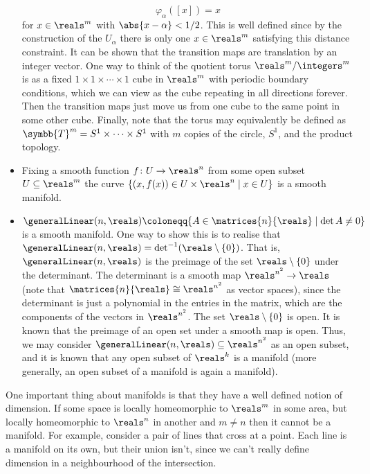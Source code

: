 \documentclass[fleqn]{NotesClass}
\newcommand{\torus}{\symbb{T}}
\newcommand{\isomorphic}{\cong}
\begin{document}
\begin{exm}{}{}
\begin{itemize}
            \begin{equation}
                \varphi_\alpha([x]) = x
            \end{equation}
            for \(x \in \reals^m\) with \(\abs{x - \alpha} < 1/2\).
            This is well defined since by the construction of the \(U_\alpha\) there is only one \(x \in \reals^m\) satisfying this distance constraint.
            It can be shown that the transition maps are translation by an integer vector.
            One way to think of the quotient torus \(\reals^m/\integers^m\) is as a fixed \(1 \times 1 \times \dotsb \times 1\) cube in \(\reals^m\) with periodic boundary conditions, which we can view as the cube repeating in all directions forever.
            Then the transition maps just move us from one cube to the same point in some other cube.
            Finally, note that the torus may equivalently be defined as \(\torus^m = S^1 \times \dotsb \times S^1\) with \(m\) copies of the circle, \(S^1\), and the product topology.
            \item Fixing a smooth function \(f \colon U \to \reals^n\) from some open subset \(U \subseteq \reals^m\) the curve \(\{(x, f(x)) \in U \times \reals^n \mid x \in U\}\) is a smooth manifold.
            \item \(\generalLinear(n, \reals) \coloneqq \{A \in \matrices{n}{\reals} \mid \det A \ne 0\}\) is a smooth manifold.
            One way to show this is to realise that \(\generalLinear(n, \reals) = \det^{-1}(\reals \setminus \{0\})\).
            That is, \(\generalLinear(n, \reals)\) is the preimage of the set \(\reals \setminus \{0\}\) under the determinant.
            The determinant is a smooth map \(\reals^{n^2} \to \reals\) (note that \(\matrices{n}{\reals} \isomorphic \reals^{n^2}\) as vector spaces), since the determinant is just a polynomial in the entries in the matrix, which are the components of the vectors in \(\reals^{n^2}\).
            The set \(\reals \setminus \{0\}\) is open.
            It is known that the preimage of an open set under a smooth map is open.
            Thus, we may consider \(\generalLinear(n, \reals) \subseteq \reals^{n^2}\) as an open subset, and it is known that any open subset of \(\reals^k\) is a manifold (more generally, an open subset of a manifold is again a manifold).
        \end{itemize}
    \end{exm}
    
    One important thing about manifolds is that they have a well defined notion of dimension.
    If some space is locally homeomorphic to \(\reals^m\) in some area, but locally homeomorphic to \(\reals^n\) in another and \(m \ne n\) then it cannot be a manifold.
    For example, consider a pair of lines that cross at a point.
    Each line is a manifold on its own, but their union isn't, since we can't really define dimension in a neighbourhood of the intersection.
    
\end{document}
